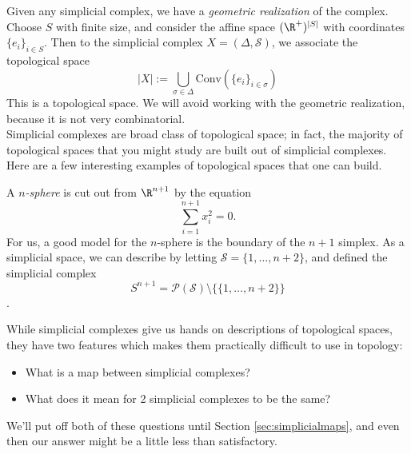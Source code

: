 Given any simplicial complex, we have a \emph{geometric realization} of the complex. Choose $S$ with finite size, and consider the affine space $(\R^+)^{|S|}$ with coordinates $\{e_i\}_{i\in S}$. Then to the simplicial complex $X=(\Delta, \mathcal S)$, we associate the topological space 
\[|X|:=\bigcup_{\sigma \in \Delta} \text{Conv}(\{e_i\}_{i\in \sigma})\]
 This is a topological space. We will avoid working with the geometric realization, because it is not very combinatorial. \\
 Simplicial complexes are broad class of topological space; in fact, the majority of topological spaces that you might study are built out of simplicial complexes. Here are a few interesting examples of topological spaces that one can build. 
\begin{example}
A \emph{$n$-sphere} is cut out from $\R^{n+1}$ by the equation
\[\sum_{i=1}^{n+1} x_i^2=0.\]
For us, a good model for the $n$-sphere is the boundary of the $n+1$ simplex. As a simplicial space, we can describe by letting $\mathcal S=\{1,\ldots, n+2\} $, and defined the simplicial complex
\[S^{n+1}=\mathcal P(\mathcal S)\setminus\{\{1,\ldots, n+2\}\}\]
.  \label{def:nsphere}
\end{example}
While simplicial complexes give us hands on descriptions of topological spaces, they have two features which makes them practically difficult to use in topology:
\begin{itemize}
\item What is a map between simplicial complexes?
\item What does it mean for 2 simplicial complexes to be the same?
\end{itemize}
We'll put off both of these questions until Section \ref{sec:simplicialmaps}, and even then our answer might be a little less than satisfactory. 
